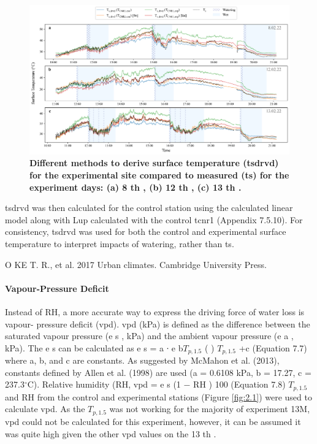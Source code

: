 \documentclass[final,3p,times,authoryear]{elsarticle}
\begin{document}
\begin{figure}
\centering
\includegraphics[trim={0 0 0 0},clip,scale=1.0]{pict027.png}
\caption{\bf Different methods to derive surface temperature (\gls{tsdrvd}) for the experimental site compared to
measured (\gls{ts}) for the experiment days: (a) 8 th , (b) 12 th , (c) 13 th .}
 \label{fig:7.8}
\end{figure}

\gls{tsdrvd} was then calculated for the control station using the calculated linear model along
with \gls{Lup} calculated with the control \gls{tcnr1} (Appendix 7.5.10). For consistency, \gls{tsdrvd} was
used for both the control and experimental surface temperature to interpret impacts of
watering, rather than \gls{ts}.

O KE T. R., et al. 2017 Urban climates. Cambridge University Press.


\paragraph{Vapour-Pressure Deficit}\label{sec:appendix7.4.3}

Instead of RH, a more accurate way to express the driving force of water loss is vapour-
pressure deficit (\gls{vpd}). \gls{vpd} (kPa) is defined as the difference between the saturated
vapour pressure (e s , kPa) and the ambient vapour pressure (e a , kPa).
The e s can be calculated as
e s = a ∙ e
b$T_{p,1.5}$
(
)
$T_{p,1.5}$ +c
(Equation 7.7)
where a, b, and c are constants. As suggested by McMahon et al. (2013), constants
defined by Allen et al. (1998) are used (a = 0.6108 kPa, b = 17.27, c = 237.3$^{\circ}$C).
Relative humidity (RH, %
\gls{vpd} = e s (1 −
RH
)
100
(Equation 7.8)
$T_{p,1.5}$ and RH from the control and experimental stations (Figure \ref{fig:2.1}) were used to
calculate \gls{vpd}. As the $T_{p,1.5}$ was not working for the majority of experiment 13M, \gls{vpd}
could not be calculated for this experiment, however, it can be assumed it was quite
high given the other \gls{vpd} values on the 13 th .
\end{document}
